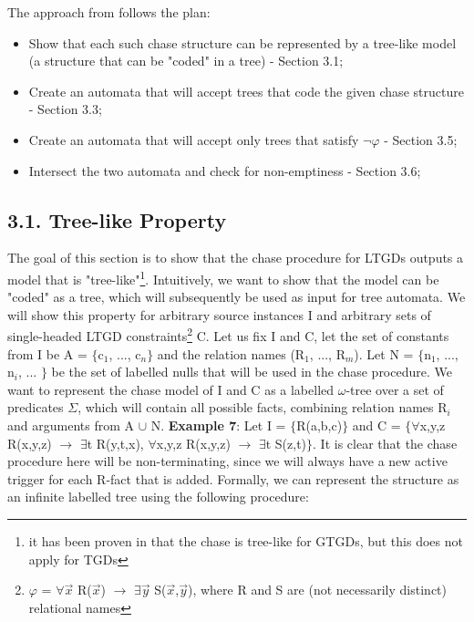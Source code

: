 \documentclass[11pt, a4paper, dvipsnames]{article}
\begin{document}
\noindent The approach from \cite{decidable} follows the plan:
\begin{itemize}
	\item Show that each such chase structure can be represented by a tree-like model (a structure that can be "coded" in a tree) - Section 3.1;
	\item Create an automata that will accept trees that code the given chase structure - Section 3.3;
	\item Create an automata that will accept only trees that satisfy $\neg \varphi$ - Section 3.5;
	\item Intersect the two automata and check for non-emptiness - Section 3.6;
\end{itemize}

\subsection{3.1. Tree-like Property}
The goal of this section is to show that the chase procedure for LTGDs outputs a model that is "tree-like"\footnote{it has been proven in \cite{decidable} that the chase is tree-like for GTGDs, but this does not apply for TGDs}. Intuitively, we want to show that the model can be "coded" as a tree, which will subsequently be used as input for tree automata.\newline
We will show this property for arbitrary source instances I and arbitrary sets of single-headed LTGD constraints\footnote{$\varphi$ = $\forall \vec{x}$ R($\vec{x}$) $\rightarrow$ $\exists \vec{y}$ S($\vec{x}$,$\vec{y}$), where R and S are (not necessarily distinct) relational names} C. Let us fix I and C, let the set of constants from I be A = $\{$c$_{1}$, ..., c$_{n}\}$ and the relation names (R$_{1}$, ..., R$_{m}$). Let N = $\{$n$_{1}$, ..., n$_{i}$, ... $\}$ be the set of labelled nulls that will be used in the chase procedure. We want to represent the chase model of I and C as a labelled $\omega$-tree over a set of predicates $\Sigma$, which will contain all possible facts, combining relation names R$_{i}$ and arguments from A $\cup$ N.\newline
\textbf{Example 7}: Let I = $\{$R(a,b,c)$\}$ and C = $\{\forall$x,y,z R(x,y,z) $\rightarrow$ $\exists$t R(y,t,x), $\forall$x,y,z R(x,y,z) $\rightarrow$ $\exists$t S(z,t)$\}$. It is clear that the chase procedure here will be non-terminating, since we will always have a new active trigger for each R-fact that is added. 
Formally, we can represent the structure as an infinite labelled tree using the following procedure:
\end{document}
